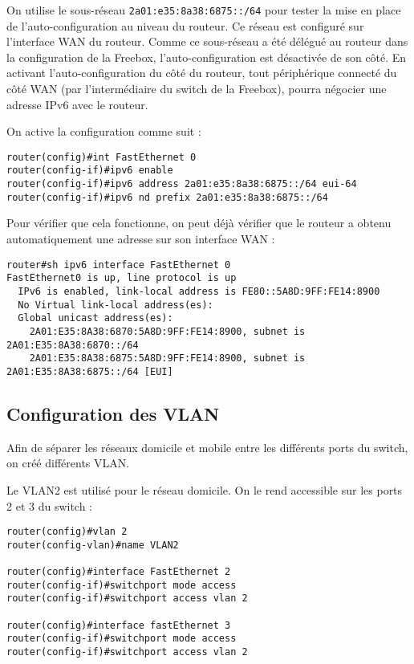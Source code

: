 On utilise le sous-réseau \texttt{2a01:e35:8a38:6875::/64} pour tester la mise en place de l'auto-configuration au niveau du routeur.
Ce réseau est configuré sur l'interface WAN du routeur.
Comme ce sous-réseau a été délégué au routeur dans la configuration de la Freebox, l'auto-configuration est désactivée de son côté.
En activant l'auto-configuration du côté du routeur, tout périphérique connecté du côté WAN (par l'intermédiaire du switch de la Freebox), pourra négocier une adresse IPv6 avec le routeur.

On active la configuration comme suit :

\begin{lstlisting}
router(config)#int FastEthernet 0
router(config-if)#ipv6 enable
router(config-if)#ipv6 address 2a01:e35:8a38:6875::/64 eui-64
router(config-if)#ipv6 nd prefix 2a01:e35:8a38:6875::/64
\end{lstlisting}

Pour vérifier que cela fonctionne, on peut déjà vérifier que le routeur a obtenu automatiquement une adresse sur son interface WAN :
\begin{lstlisting}
router#sh ipv6 interface FastEthernet 0
FastEthernet0 is up, line protocol is up
  IPv6 is enabled, link-local address is FE80::5A8D:9FF:FE14:8900 
  No Virtual link-local address(es):
  Global unicast address(es):
    2A01:E35:8A38:6870:5A8D:9FF:FE14:8900, subnet is 2A01:E35:8A38:6870::/64
    2A01:E35:8A38:6875:5A8D:9FF:FE14:8900, subnet is 2A01:E35:8A38:6875::/64 [EUI]
\end{lstlisting}

\subsection{Configuration des VLAN}

Afin de séparer les réseaux domicile et mobile entre les différents ports du switch, on créé différents VLAN.

Le VLAN2 est utilisé pour le réseau domicile.
On le rend accessible sur les ports 2 et 3 du switch :

\begin{lstlisting}
router(config)#vlan 2
router(config-vlan)#name VLAN2

router(config)#interface FastEthernet 2
router(config-if)#switchport mode access
router(config-if)#switchport access vlan 2

router(config)#interface fastEthernet 3
router(config-if)#switchport mode access
router(config-if)#switchport access vlan 2
\end{lstlisting}

